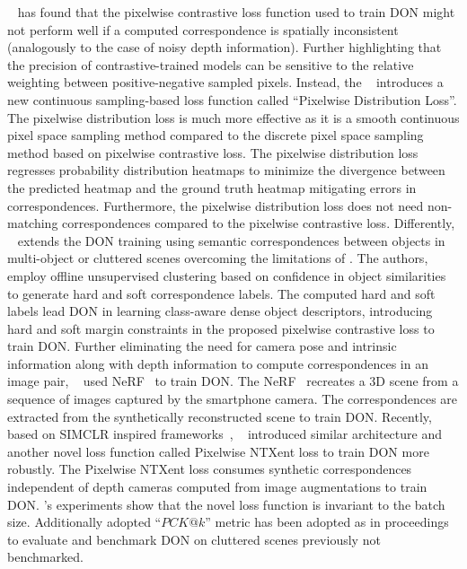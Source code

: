 \citeauthor{florence2020dense}~\cite{florence2020dense} has found that the pixelwise contrastive loss function used to train DON might not perform well if a computed
correspondence is spatially inconsistent (analogously to the case of noisy depth information). Further highlighting that the precision
of contrastive-trained models can be sensitive to the
relative weighting between positive-negative sampled pixels. Instead, the \citeauthor{florence2020dense}~\cite{florence2020dense} introduces a new continuous
sampling-based loss function called ``Pixelwise Distribution Loss''.
The pixelwise distribution loss is much more effective as it is a smooth continuous pixel space sampling method compared to the
discrete pixel space sampling method based on pixelwise contrastive loss.
The pixelwise distribution loss regresses probability distribution heatmaps to minimize the divergence between the predicted
heatmap and the ground truth heatmap mitigating errors in correspondences. Furthermore, the pixelwise distribution loss does not
need non-matching correspondences compared to the
pixelwise contrastive loss.
Differently, \citeauthor{hadjivelichkov2021fully}~\cite{hadjivelichkov2021fully} extends the DON training using semantic correspondences between objects in multi-object
or cluttered scenes overcoming the limitations of \parencites{hartley2003multiple}{belkin2003laplacian}.
The authors, \citeauthor{hadjivelichkov2021fully}~\cite{hadjivelichkov2021fully} employ offline unsupervised clustering based on confidence in object similarities to generate hard and soft correspondence labels.
The computed hard and soft labels lead DON in learning class-aware dense object descriptors, introducing hard and soft margin constraints in the proposed pixelwise contrastive loss to train DON.
Further eliminating the need for camera pose and intrinsic information along with depth information to compute correspondences in an image pair, \citeauthor{nerf-Supervision}~\cite{nerf-Supervision} used
NeRF~\cite{mildenhall2021nerf} to train DON. The NeRF~\cite{mildenhall2021nerf} recreates a 3D scene from a sequence of images captured by the smartphone camera. The correspondences are extracted from
the synthetically reconstructed scene to train DON.
Recently, based on SIMCLR inspired frameworks~\parencites{chen2020simple}{zbontar2021barlow},
\citeauthor{adrian2022efficient}~\cite{adrian2022efficient} introduced similar architecture and another novel loss function called
Pixelwise NTXent loss to train DON more robustly.
The Pixelwise NTXent loss consumes synthetic correspondences independent of depth cameras computed from image augmentations to train DON.
\citeauthor{adrian2022efficient}'s experiments show that the novel loss function is invariant to the batch size.
Additionally adopted ``$PCK@k$''
metric has been adopted as in proceedings \parencites{chai2019multi}{fathy2018hierarchical} to evaluate and benchmark
DON on cluttered scenes previously not benchmarked.

